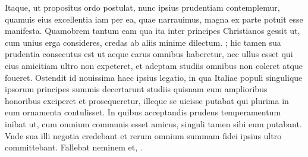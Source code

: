 \documentclass[a5paper,twoside]{article}
\begin{document}
Itaque, ut propositus ordo postulat, nunc ipsius prudentiam contemplemur, quamuis eius excellentia iam per ea, quae narrauimus, magna ex parte potuit esse manifesta. Quamobrem tantum eam   qua ita  inter principes Christianos gessit ut, cum unius erga   consideres, credas ab aliis minime dilectum. ; hic tamen sua prudentia consecutus est ut aeque carus omnibus haberetur, nec ullus esset qui eius amicitiam ultro non expeteret, et adeptam studiis omnibus non coleret atque foueret. Ostendit id nouissima haec ipsius legatio, in qua  Italiae populi singulique ipsorum principes summis decertarunt studiis quisnam eum amplioribus honoribus exciperet et prosequeretur, illeque se uicisse putabat qui plurima in eum ornamenta contulisset. In quibus acceptandis  prudens temperamentum inibat ut, cum omnium communis esset amicus, singuli tamen sibi eum  putabant. Vnde sua illi negotia credebant et rerum omnium summam fidei ipsius ultro committebant. Fallebat neminem et, . 
\end{document}
